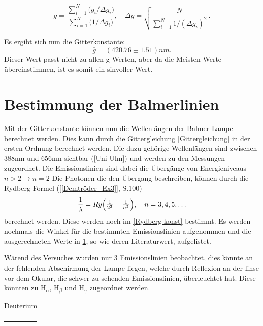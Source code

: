 \begin{equation}
  \overline{g}
  = \frac{\sum_{i=1}^{N} \bigl(g_i/\Delta g_i\bigr)}
         {\sum_{i=1}^{N} \bigl(1/\Delta g_i\bigr)},
  \quad
  \Delta\overline{g}
  = \sqrt{\frac{N}{\sum_{i=1}^{N} 1/(\Delta g_i)^{2}}}\,.
\end{equation}

Es ergibt sich nun die Gitterkonstante:
\begin{equation}
    \overline{g} = (420.76 \pm 1.51) nm.
    \label{gitterkon}
\end{equation}
Dieser Wert passt nicht zu allen g-Werten, aber da die Meisten Werte übereinstimmen, ist es somit ein sinvoller Wert. 

\section{Bestimmung der Balmerlinien}

Mit der Gitterkonstante können nun die Wellenlängen der Balmer-Lampe berechnet werden. 
Dies kann durch die Gittergleichung \ref{Gittergleichung} in der ersten Ordnung berechnet werden.
Die dazu gehörige Wellenlängen sind zwischen 388nm und 656nm sichtbar ([Uni Ulm]) und werden zu den Messungen zugeordnet.
Die Emissionslinien sind dabei die Übergänge von Energieniveaus $n > 2 \xrightarrow{} n = 2$ 
Die Photonen die den Übergang beschreiben, können durch die Rydberg-Formel (\cref{[Demtröder_Ex3]}, S.100) 
\begin{equation}
  \frac{1}{\lambda}
  = Ry\Bigl(\tfrac{1}{2^{2}} - \tfrac{1}{n^{2}}\Bigr),
  \quad n=3,4,5,\dots
  \label{Rydberg-Formel}
\end{equation}
berechnet werden.
Diese werden noch im \cref{Rydberg-konst} bestimmt. 
Es werden nochmals die Winkel für die bestimmten Emissionslinien aufgenommen und die ausgerechneten Werte in \cref{tab: gesehenes deut}, so wie deren Literaturwert, aufgelistet. 

Wärend des Versuches wurden nur 3 Emissionslinien beobachtet, dies könnte an der fehlenden Abschirmung der Lampe liegen, welche durch Reflexion an der linse vor dem Okular, die schwer zu sehenden Emissionslinien, überleuchtet hat. %
Diese könnten zu H$_\alpha$, H$_\beta$ und H$_\gamma$ zugeordnet werden.

\begin{table}[htbp]
    \centering
    \begin{tabular}{c|c}
         &  \\
         & 
    \end{tabular}
    \caption{Deuterium}
    \label{tab: gesehenes deut}
\end{table}

